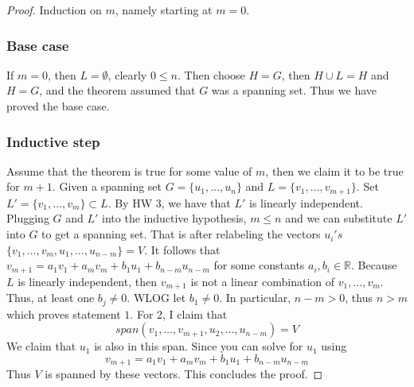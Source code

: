 \documentclass{article}
\newtheorem{one minute paper}[theorem]{One Minute Paper}
\begin{document}
\begin{proof}
    Induction on $m$, namely starting at $m = 0$.
    \subsubsection*{Base case}
    If $m = 0$, then $L = \emptyset$, clearly $0 \leq n$. Then choose $H = G$, then $H \cup L = H$ and $H = G$, and the theorem assumed that $G$ was a spanning set. Thus we have proved the base case. 

    \subsubsection*{Inductive step}
    Assume that the theorem is true for some value of $m$, then we claim it to be true for $m+1$. Given a spanning set $G = \{u_1, \dots, u_n\}$ and $L = \{v_1, \dots, v_{m+1}\}$. Set $L' = \{v_1, \dots, v_{m}\} \subset L$. By HW 3, we have that $L'$ is linearly independent. Plugging $G$ and $L'$ into the inductive hypothesis, $m \leq n$ and we can substitute $L'$ into $G$ to get a spanning set. 
    That is after relabeling the vectors $u_i's$ $\{v_1, \dots, v_{m}, u_1, \dots, u_{n-m} \} = V$. It follows that $v_{m+1} = a_1v_1 + a_mv_m + b_1u_1 + b_{n-m}u_{n-m}$ for some constants $a_i, b_i \in \mathbb{R}$. Because $L$ is linearly independent, then $v_{m+1}$ is not a linear combination of $v_1, \dots, v_m$. Thus, at least one $b_j \neq 0$. WLOG let $b_1 \neq 0$. In particular, $n - m >0$, thus $n > m$ which proves statement $1$. For 2, I claim that 
    \begin{equation}
        span(v_1, \dots, v_{m+1}, u_2, \dots, u_{n-m}) = V
    \end{equation} 
    We claim that $u_1$ is also in this span. Since you can solve for $u_1$ using 
    \begin{equation}
        v_{m+1} = a_1v_1 + a_mv_m + b_1u_1 + b_{n-m}u_{n-m}
    \end{equation}
    Thus $V$ is spanned by these vectors. This concludes the proof. 
\end{proof}
\end{document}

